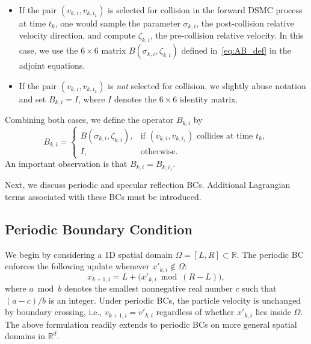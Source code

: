 \documentclass[12pt,nopreprintline]{elsarticle}
\begin{document}
\begin{itemize}
    \item If the pair $(v_{k,i}, v_{k,i_1})$ is selected for collision in the forward DSMC process at time $t_k$, one would sample the parameter $\sigma_{k,i}$, the post-collision relative velocity direction, and compute $\zeta_{k,i}$, the pre-collision relative velocity. In this case, we use the $6\times6$ matrix $B(\sigma_{k,i}, \zeta_{k,i})$ defined in~\eqref{eq:AB_def} in the adjoint equations.
    \item If the pair $(v_{k,i}, v_{k,i_1})$ is \emph{not} selected for collision, we slightly abuse notation and set $B_{k,i} = I$, where $I$ denotes the $6\times6$ identity matrix.
\end{itemize}

Combining both cases, we define the operator $B_{k,i}$ by
\begin{equation}
\label{eq:B_ki}
B_{k,i} =
\begin{cases}
B(\sigma_{k,i}, \zeta_{k,i}), & \text{if } (v_{k,i}, v_{k,i_1}) \text{ collides at time } t_k,\\
I, & \text{otherwise.}
\end{cases}
\end{equation}
An important observation is that $B_{k,i} = B_{k,i_1}$.

Next, we discuss periodic and specular reflection BCs. Additional Lagrangian terms associated with these BCs must be introduced.

\subsection{Periodic Boundary Condition}
\label{subsec:P}

We begin by considering a 1D spatial domain $\Omega = [L,R] \subset \mathbb{R}$. The periodic BC enforces the following update whenever $x'_{k,i} \notin \Omega$:
\begin{equation}
x_{k+1,i} = L + \bigl( x'_{k,i} \bmod (R-L) \bigr),
\end{equation}
where $a \bmod b$ denotes the smallest nonnegative real number $c$ such that $(a-c)/b$ is an integer. Under periodic BCs, the particle velocity is unchanged by boundary crossing, i.e., $v_{k+1,i} = v'_{k,i}$ regardless of whether $x'_{k,i}$ lies inside $\Omega$. The above formulation readily extends to periodic BCs on more general spatial domains in $\mathbb{R}^d$.
\end{document}
